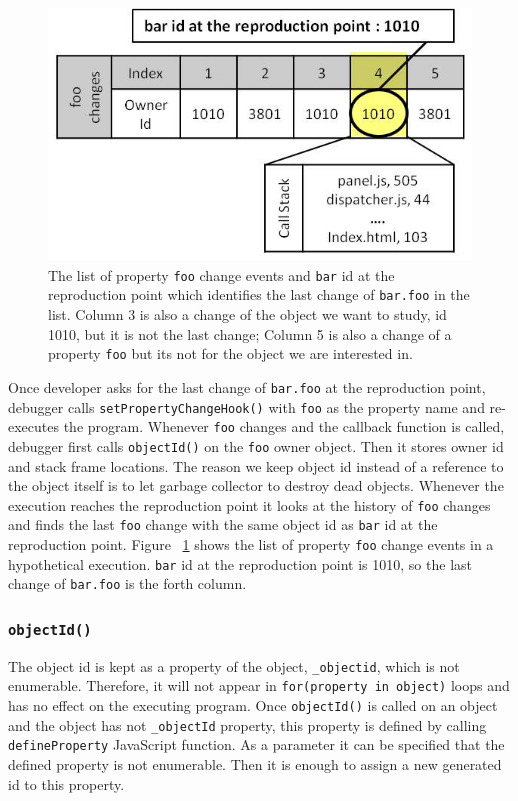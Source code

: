 \documentclass[preprint]{sigplanconf}
\begin{document}
\begin{figure}[htp]
\includegraphics[width=.48\textwidth]{6-foo-changes1.jpg}
\caption{The list of property \texttt{foo} change events and \texttt{bar} id at the reproduction point which identifies the last change of \texttt{bar.foo} in the list. Column 3 is also a change of the object we want to study, id 1010, but it is not the last change; Column 5 is also a change of a property \texttt{foo} but its not for the object we are interested in.}
\label{fig:foo-changes1}
\end{figure}

Once developer asks for the last change of \texttt{bar.foo} at the reproduction point, debugger calls \texttt{setPropertyChangeHook()} with \texttt{foo} as the property name and re-executes the program. Whenever \texttt{foo} changes and the callback function is called, debugger first calls \texttt{objectId()} on the \texttt{foo} owner object. Then it stores owner id and stack frame locations. The reason we keep object id instead of a reference to the object itself is to let garbage collector to destroy dead objects. Whenever the execution reaches the reproduction point it looks at the history of \texttt{foo} changes and finds the last \texttt{foo} change with the same object id as \texttt{bar} id at the reproduction point. Figure ~\ref{fig:foo-changes1} shows the list of property \texttt{foo} change events in a hypothetical execution. \texttt{bar} id at the reproduction point is 1010, so the last change of \texttt{bar.foo} is the forth column.

\subsubsection{\texttt{objectId()}}
The object id is kept as a property of the object, \texttt{\_objectid}, which is not enumerable. Therefore, it will not appear in \texttt{for(property in object)} loops and has no effect on the executing program. Once \texttt{objectId()} is called on an object and the object has not \texttt{\_objectId} property, this property is defined by calling \texttt{defineProperty} JavaScript function. As a parameter it can be specified that the defined property is not enumerable. Then it is enough to assign a new generated id to this property.
\end{document}
